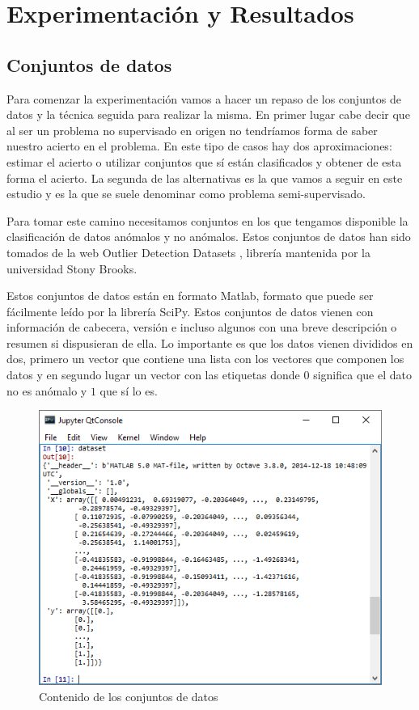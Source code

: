 \chapter{Experimentación y Resultados}
\label{chapter:experimentacion_resultados}

\section{Conjuntos de datos}

Para comenzar la experimentación vamos a hacer un repaso de los conjuntos de datos y la técnica seguida para realizar la misma. En primer lugar cabe decir que al ser un problema no supervisado en origen no tendríamos forma de saber nuestro acierto en el problema. En este tipo de casos hay dos aproximaciones: estimar el acierto o utilizar conjuntos que sí están clasificados y obtener de esta forma el acierto. La segunda de las alternativas es la que vamos a seguir en este estudio y es la que se suele denominar como problema semi-supervisado. 

Para tomar este camino necesitamos conjuntos en los que tengamos disponible la clasificación de datos anómalos y no anómalos. Estos conjuntos de datos han sido tomados de la web Outlier Detection Datasets \cite{shebuti_ryana_odds_2016}, librería mantenida por la universidad Stony Brooks.

Estos conjuntos de datos están en formato Matlab, formato que puede ser fácilmente leído por la librería SciPy. Estos conjuntos de datos vienen con información de cabecera, versión e incluso algunos con una breve descripción o resumen si dispusieran de ella. Lo importante es que los datos vienen divididos en dos, primero un vector que contiene una lista con los vectores que componen los datos y en segundo lugar un vector con las etiquetas donde $0$ significa que el dato no es anómalo y $1$ que sí lo es.

\begin{figure}[H]
	\centering
	\label{dataset_matlab}
	\includegraphics[scale=0.8]{imagenes/datasets_matlab}
	\caption{Contenido de los conjuntos de datos}
\end{figure}

